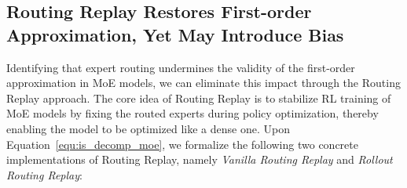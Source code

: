 \documentclass{article}
\begin{document}
\subsection{Routing Replay Restores First-order Approximation, Yet May Introduce Bias}
\label{subsec:routing_replay}

Identifying that expert routing undermines the validity of the first-order approximation in MoE models, we can eliminate this impact through the Routing Replay \citep{gspo} approach.
The core idea of Routing Replay is to stabilize RL training of MoE models by fixing the routed experts during policy optimization, thereby enabling the model to be optimized like a dense one.
Upon Equation~\eqref{equ:is_decomp_moe}, we formalize the following two concrete implementations of Routing Replay, namely \textit{Vanilla Routing Replay} and \textit{Rollout Routing Replay}:
\end{document}
